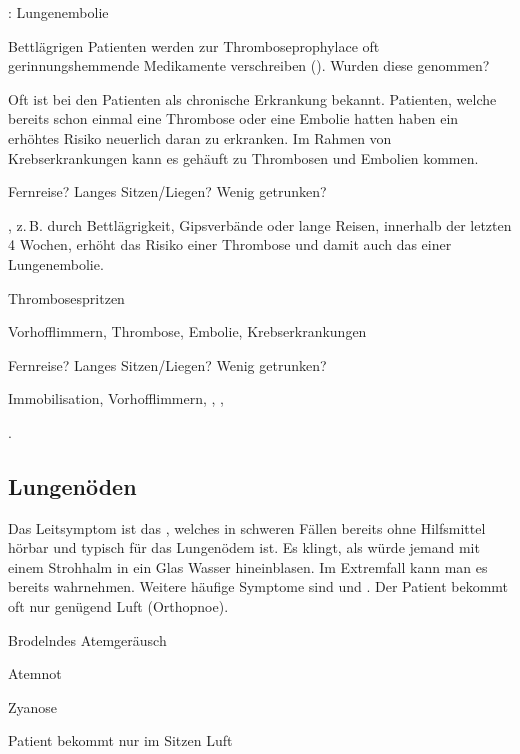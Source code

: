 \documentclass[
ngerman,
paper=a4,
asymmetric,
fontsize=10pt,
draft=false,
numbers=noenddot,
bibtotocnumbered,
footnotes=multiple,
]{scrreprt}
\newcommand{\jALT}{\vspace{6pt}\noindent{\color{red}\sffamily\textbf{DELETED}\hrulefill\newline}}
\newcommand{\jNEUende}{\newline{\color{green}\rule{\linewidth}{3pt}\newline}}
\begin{document}
{{\TxSAMPLER}: Lungenembolie}
 {
 \begin{SAMPLERText}
  \item[\SAMPLER{M}] Bettlägrigen Patienten werden zur
  Thromboseprophylace oft gerinnungshemmende Medikamente
  verschreiben (). Wurden diese
  genommen?
  \item[\SAMPLER{P}]
  Oft ist bei den Patienten  als
  chronische Erkrankung bekannt. Patienten, welche bereits
  schon einmal eine Thrombose oder eine Embolie hatten
  haben ein erhöhtes Risiko neuerlich daran zu erkranken. Im
  Rahmen von Krebserkrankungen kann es gehäuft zu Thrombosen
  und Embolien kommen.
   \item[\SAMPLER{L}]
  \item[\SAMPLER{E}] Fernreise? Langes Sitzen/Liegen? Wenig
  getrunken?
   \item[\SAMPLER{R}] , z.\,B. durch Bettlägrigkeit,
  Gipsverbände oder lange Reisen, innerhalb der letzten 4
  Wochen, erhöht das Risiko einer Thrombose und damit auch das
  einer Lungenembolie. 
 \end{SAMPLERText}
 }
 {
 \begin{SAMPLERSlide}
  \item[\SAMPLER{M}] Thrombosespritzen
  \item[\SAMPLER{P}] Vorhofflimmern, Thrombose, Embolie,
  Krebserkrankungen
  \item[\SAMPLER{E}] Fernreise? Langes Sitzen/Liegen? Wenig
  getrunken?
  \item[\SAMPLER{R}] Immobilisation, Vorhofflimmern,
  , , 
 \end{SAMPLERSlide}
 }
 {}
 {}
 {}
 .
\jNEUende


\subsection{Lungenöden}
\jALT

{%
%
Das Leitsymptom ist das , welches
in schweren Fällen bereits ohne Hilfsmittel hörbar und
typisch für das Lungenödem ist. Es klingt, als würde jemand
mit einem Strohhalm in ein Glas Wasser hineinblasen. Im
Extremfall kann man es bereits  wahrnehmen.
Weitere häufige Symptome sind  und .
Der Patient bekommt oft nur  genügend
Luft (Orthopnoe).
}{
\begin{compactitem}
  \item Brodelndes Atemgeräusch
  \item Atemnot
  \item Zyanose
  \item Patient bekommt nur im Sitzen Luft
\end{compactitem}
}{}{}{}
\end{document}
